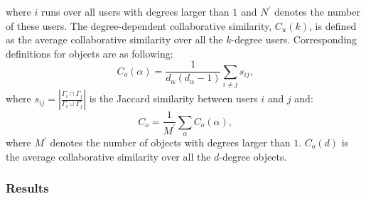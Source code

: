       where $i$ runs over all users with degrees larger than $1$ and $N^\prime$ denotes the number of these users. The degree-dependent collaborative similarity, $C_u(k)$, is defined as the average collaborative similarity over all the $k$-degree users. Corresponding definitions for objects are as following:
      \begin{equation}
        C_o(\alpha) = \frac{1}{d_\alpha(d_\alpha-1)} \sum_{i\neq j} s_{ij}\mbox{,}
      \end{equation}
      where $s_{ij} = \left| \frac{\Gamma_i \cap \Gamma_j}{\Gamma_i \cup \Gamma_j} \right|$ is the Jaccard similarity between users $i$ and $j$ and:
      \begin{equation}
        C_o = \frac{1}{M^\prime} \sum_\alpha C_o(\alpha)\mbox{,}
      \end{equation}
      where $M^\prime$ denotes the number of objects with degrees larger than $1$. $C_o(d)$ is the average collaborative similarity over all the $d$-degree objects.

    \subsubsection{Results}
    
